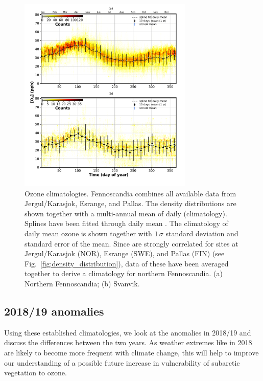 \documentclass[bg, manuscript]{copernicus}
\begin{document}
\begin{figure}[t]
  \includegraphics[width=8.3cm]{fig06}
  \caption{Ozone climatologies. Fennoscandia combines all available data from Jergul/Karasjok, Esrange, and Pallas. The density distributions are shown together with a multi-annual mean of daily \chem{[O_3]} (climatology). Splines have been fitted through daily mean \chem{[O_3]}. The climatology of daily mean ozone is shown together with $1\,\sigma$ standard deviation and standard error of the mean. Since \chem{[O_3]} are strongly correlated for sites at Jergul/Karasjok (NOR), Esrange (SWE), and Pallas (FIN) (see Fig.~\ref{fig:density_distribution}), data of these have been averaged together to derive a climatology for northern Fennoscandia. (a) Northern Fennoscandia; (b) Svanvik.}
  \label{fig:ozone_climatology_fenoscandic_obs_spline}
\end{figure}

\subsection{2018/19 anomalies}
\label{subsec:anomalies}
Using these established climatologies, we look at the anomalies in 2018/19 and discuss the differences between the two years. As weather extremes like in 2018 are likely to become more frequent with climate change, this will help to improve our understanding of a possible future increase in vulnerability of subarctic vegetation to ozone. 
\end{document}
